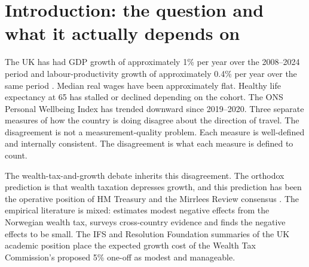 \documentclass[11pt]{article}
\begin{document}
\begin{abstract}
We position the argument against the Mirrlees optimal-taxation
framework \citep{mirrlees2011tax, piketty2013theory,
saez2018social, farhi2010progressive}, the GDP-critique tradition
\citep{coyle2014gdp, pilling2018growth, mazzucato2018value,
stiglitz2009commission}, the UK productivity-puzzle literature
\citep{ons2024productivity, atkinson2020productivity}, and the
empirical wealth-tax flight literature
\citep{young2016millionaire, akcigit2016inventors, moretti2017taxing,
ringstad2024norwegian}.  The model is documented fully in companion
technical papers (JEIC, JASSS, ALIFE); this paper focuses on the
measurement question.
\end{abstract}

\section{Introduction: the question and what it actually depends on}
\label{sec:intro}

The UK has had GDP growth of approximately 1\% per year over the
2008--2024 period and labour-productivity growth of approximately
0.4\% per year over the same period \citep{ons2024productivity}.
Median real wages have been approximately flat.  Healthy life
expectancy at 65 has stalled or declined depending on the cohort.
The ONS Personal Wellbeing Index has trended downward since
2019--2020.  Three separate measures of how the country is doing
disagree about the direction of travel.  The disagreement is not a
measurement-quality problem.  Each measure is well-defined and
internally consistent.  The disagreement is what each measure is
defined to count.

The wealth-tax-and-growth debate inherits this disagreement.  The
orthodox prediction is that wealth taxation depresses growth, and
this prediction has been the operative position of HM Treasury and
the Mirrlees Review consensus
\citep{mirrlees2011tax, saez2018social, farhi2010progressive}.  The
empirical literature is mixed: \citet{ringstad2024norwegian}
estimates modest negative effects from the Norwegian wealth tax,
\citet{londono2021wealth} surveys cross-country evidence and finds
the negative effects to be small.  The IFS and Resolution
Foundation summaries of the UK academic position
\citep{atkinson2020productivity} place the expected growth cost of
the Wealth Tax Commission's proposed 5\% one-off as modest and
manageable.
\end{document}
